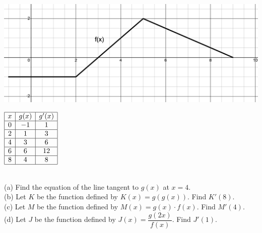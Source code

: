  \\
\begin{minipage}[t]{0.75\textwidth} \vspace{0pt}%
    \includegraphics[width = \textwidth]{Support/Chapter 1 Graphics/1.7-Graphic3.png}
\end{minipage} \hfill \begin{minipage}[t]{0.2\textwidth} \vspace{0pt}%
    \def\arraystretch{1.4}
    $\begin{array}{|c|c|c|}
        \hline
        x & g(x) & g'(x) \\ \hline
        0 & -1 & 1 \\ \hline
        2 & 1 & 3 \\ \hline
        4 & 3 & 6 \\ \hline
        6 & 6 & 12 \\ \hline
        8 & 4 & 8 \\
        \hline
    \end{array}$
\end{minipage} \\

(a) Find the equation of the line tangent to $g(x)$ at $x = 4$. \\[11pt]
(b) Let $K$ be the function defined by $K(x) = g(g(x))$. Find $K'(8)$. \\[11pt]
(c) Let $M$ be the function defined by $M(x) = g(x) \cdot f(x)$. Find $M'(4)$. \\[11pt]
(d) Let $J$ be the function defined by $J(x) = \dfrac{g(2x)}{f(x)}$. Find $J'(1)$. \\[11pt]

